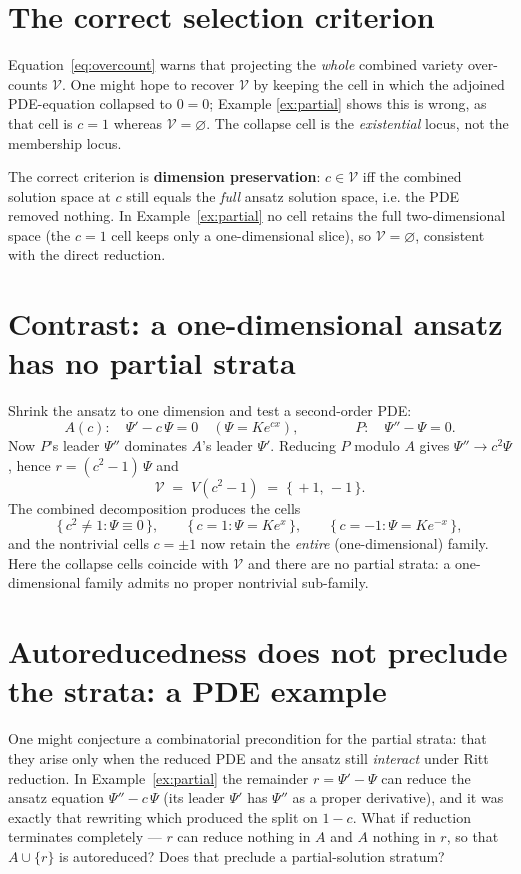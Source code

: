 \documentclass[11pt]{article}
\newcommand{\Psib}{\Psi}
\newcommand{\Var}{\mathcal{V}}
\begin{document}
\section{The correct selection criterion}

Equation~\eqref{eq:overcount} warns that projecting the \emph{whole} combined
variety over-counts $\Var$. One might hope to recover $\Var$ by keeping the
cell in which the adjoined PDE-equation collapsed to $0 = 0$; Example
\ref{ex:partial} shows this is wrong, as that cell is $c = 1$ whereas
$\Var = \varnothing$. The collapse cell is the \emph{existential} locus, not
the membership locus.

The correct criterion is \textbf{dimension preservation}: $c \in \Var$ iff the
combined solution space at $c$ still equals the \emph{full} ansatz solution
space, i.e. the PDE removed nothing. In Example~\ref{ex:partial} no cell
retains the full two-dimensional space (the $c=1$ cell keeps only a
one-dimensional slice), so $\Var = \varnothing$, consistent with the direct
reduction.

\section{Contrast: a one-dimensional ansatz has no partial strata}
\label{sec:onedim}

Shrink the ansatz to one dimension and test a second-order PDE:
%
\[
A(c): \quad \Psib' - c\,\Psib = 0 \quad(\Psib = K e^{cx}),
\qquad\qquad
P: \quad \Psib'' - \Psib = 0 .
\]
%
Now $P$'s leader $\Psib''$ dominates $A$'s leader $\Psib'$. Reducing $P$ modulo
$A$ gives $\Psib'' \to c^2 \Psib$, hence $r = (c^2 - 1)\,\Psib$ and
%
\[
\Var \;=\; V(c^2 - 1) \;=\; \{\,+1,\,-1\,\} .
\]
%
The combined decomposition produces the cells
%
\[
\{\, c^2 \ne 1 : \Psib \equiv 0 \,\}, \qquad
\{\, c = 1   : \Psib = K e^{x} \,\}, \qquad
\{\, c = -1  : \Psib = K e^{-x} \,\},
\]
%
and the nontrivial cells $c = \pm 1$ now retain the \emph{entire}
(one-dimensional) family. Here the collapse cells coincide with $\Var$ and
there are no partial strata: a one-dimensional family admits no proper
nontrivial sub-family.

\section{Autoreducedness does not preclude the strata: a PDE example}

One might conjecture a combinatorial precondition for the partial strata:
that they arise only when the reduced PDE and the ansatz still \emph{interact}
under Ritt reduction. In Example~\ref{ex:partial} the remainder
$r = \Psib' - \Psib$ can reduce the ansatz equation $\Psib'' - c\,\Psib$ (its
leader $\Psib'$ has $\Psib''$ as a proper derivative), and it was exactly that
rewriting which produced the split on $1 - c$. What if reduction terminates
completely --- $r$ can reduce nothing in $A$ and $A$ nothing in $r$, so that
$A \cup \{r\}$ is autoreduced? Does that preclude a partial-solution stratum?
\end{document}
